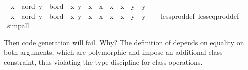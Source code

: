\begin{isabellebody}
\ \ {\isachardoublequoteopen}{\isacharparenleft}x{}\ {\isasymColon}\ {\isacharprime}a{\isasymColon}ord{\isacharcomma}\ y{}\ {\isasymColon}\ {\isacharprime}b{\isasymColon}ord{\isacharparenright}\ {\isacharless}\ {\isacharparenleft}x{}{\isacharcomma}\ y{}{\isacharparenright}\ {\isasymlongleftrightarrow}\ x{}\ {\isacharless}\ x{}\ {\isasymor}\ {\isacharparenleft}x{}\ {\isacharequal}\ x{}\ {\isasymand}\ y{}\ {\isacharless}\ y{}{\isacharparenright}{\isachardoublequoteclose}\isanewline
\ \ {\isachardoublequoteopen}{\isacharparenleft}x{}\ {\isasymColon}\ {\isacharprime}a{\isasymColon}ord{\isacharcomma}\ y{}\ {\isasymColon}\ {\isacharprime}b{\isasymColon}ord{\isacharparenright}\ {\isasymle}\ {\isacharparenleft}x{}{\isacharcomma}\ y{}{\isacharparenright}\ {\isasymlongleftrightarrow}\ x{}\ {\isacharless}\ x{}\ {\isasymor}\ {\isacharparenleft}x{}\ {\isacharequal}\ x{}\ {\isasymand}\ y{}\ {\isasymle}\ y{}{\isacharparenright}{\isachardoublequoteclose}\isanewline
%
\isadelimproof
\ \ %
\endisadelimproof
%
\isatagproof
{}\isamarkupfalse%
\ less{\isacharunderscore}prod{\isacharunderscore}def\ less{\isacharunderscore}eq{\isacharunderscore}prod{\isacharunderscore}def\ \isamarkupfalse%
\ simp{\isacharunderscore}all%
\endisatagproof
{\isafoldproof}%
%
\isadelimproof
%
\endisadelimproof
%
\begin{isamarkuptext}%
Then code generation will fail.  Why?  The definition
  of  depends on equality on both arguments,
  which are polymorphic and impose an additional 
  class constraint, thus violating the type discipline
  for class operations.


\end{isamarkuptext}
\end{isabellebody}
